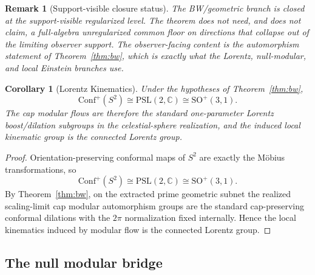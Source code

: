 \documentclass[11pt]{article}
\newtheorem{corollary}[theorem]{Corollary}
\newtheorem{remark}[theorem]{Remark}
\newcommand{\Conf}{\mathrm{Conf}}
\begin{document}
\begin{remark}[Support-visible closure status]
The BW/geometric branch is closed at the support-visible regularized level. The theorem does not need, and does not claim, a full-algebra unregularized common floor on directions that collapse out of the limiting observer support. The observer-facing content is the automorphism statement of Theorem~\ref{thm:bw}, which is exactly what the Lorentz, null-modular, and local Einstein branches use.
\end{remark}

\begin{corollary}[Lorentz Kinematics]\label{cor:lorentz}
Under the hypotheses of Theorem~\ref{thm:bw},
\[
\Conf^+(S^2)\cong \mathrm{PSL}(2,\mathbb C)\cong \mathrm{SO}^+(3,1).
\]
The cap modular flows are therefore the standard one-parameter Lorentz boost/dilation subgroups in the celestial-sphere realization, and the induced local kinematic group is the connected Lorentz group.
\end{corollary}

\begin{proof}
Orientation-preserving conformal maps of \(S^2\) are exactly the M\"obius transformations, so
\[
\Conf^+(S^2)\cong \mathrm{PSL}(2,\mathbb C)\cong \mathrm{SO}^+(3,1).
\]
By Theorem~\ref{thm:bw}, on the extracted prime geometric subnet the realized scaling-limit cap modular automorphism groups are the standard cap-preserving conformal dilations with the \(2\pi\) normalization fixed internally. Hence the local kinematics induced by modular flow is the connected Lorentz group.
\end{proof}
\subsection{The null modular bridge}
\end{document}
